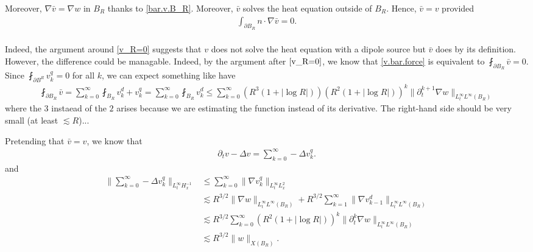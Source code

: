\documentclass[abstracton, paper=a4, fontsize=11pt,DIV=12,bibliography=totoc]{scrartcl}
\begin{document}
Moreover, $\nabla \bar v = \nabla w$ in $B_R$ thanks to \eqref{bar.v.B_R}. Moreover, $\bar v$ solves the heat equation outside of $B_R$. Hence, $\bar v = v$ provided
\begin{align} \label{v.bar.force}
    \int_{\partial B_R} n \cdot \nabla \bar v = 0.
\end{align}
\\
Indeed, the argument around \eqref{v_R=0} suggests that $v$ does not solve the heat equation with a dipole source but $\bar v$ does by its definition.
However, the difference could be managable. Indeed, by the argument after $\eqref{v_R=0}$, we know that \eqref{v.bar.force} is equivalent to $\fint_{\partial B_R} \bar v = 0$. 
Since $\fint_{\partial B^R} v_k^q = 0$ for all $k$, we can expect something like have
\begin{align*}
    \fint_{\partial B_R} \bar v =  \sum_{k = 0}^\infty \fint_{B_R}  v_k^d + v_k^q =  \sum_{k = 0}^\infty \fint_{B_R}  v_k^d \leq  \sum_{k = 0}^\infty  \left(R^{3} (1+ |\log R|)\right)\left(R^{2} (1+ |\log R|)\right)^{k}\|\partial_t^{k+1} \nabla w\|_{L^\infty_t L^\infty(B_R)} 
\end{align*}
where the $3$ instaead of the $2$ arises because we are estimating the function instead of its derivative. The right-hand side should be very small (at least $\lesssim R$)...

Pretending that $\bar v = v$, we know that
\begin{align*}
    \partial_t v - \Delta v = \sum_{k=0}^\infty -\Delta v_k^q.
\end{align*}
and
\begin{align*}
    \|\sum_{k=0}^\infty -\Delta v_k^q\|_{L^\infty_t H^{-1}_x} &\leq \sum_{k=0}^\infty \|\nabla v^q_k\|_{L^\infty_t  L^2_{x}} \\
    & \lesssim R^{3/2} \|\nabla w\|_{L^\infty_t L^\infty(B_R)}+ R^{3/2} \sum_{k=1}^\infty \|\nabla v^d_{k-1}\|_{L^\infty_t L^\infty(B_R)} \\
    & \lesssim R^{3/2} \sum_{k=0}^\infty  \left(R^{2} (1+ |\log R|)\right)^{k} \|\partial_t^{k} \nabla w\|_{L^\infty_t L^\infty(B_R)}\\
    & \lesssim R^{3/2} \|w\|_{X(B_R)}.
\end{align*}
\end{document}
